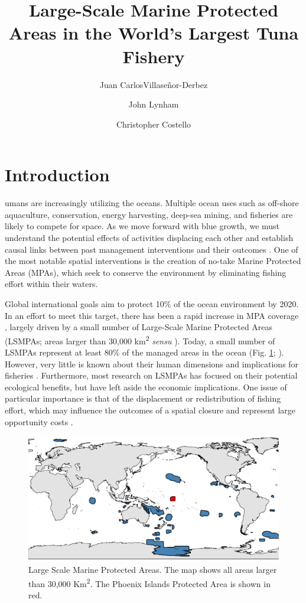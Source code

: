 \documentclass[9p,twocolumn,twoside,lineno]{pnas-new}
\title{Large-Scale Marine Protected Areas in the World's Largest Tuna Fishery}
\author[a,1]{Juan CarlosVillase\~{n}or-Derbez}
\author[b]{John Lynham}
\author[a]{Christopher Costello}
\affil[a]{Bren School of Environmental Science \& Management, University of California at Santa Barbara, Santa Barbara, CA}
\affil[b]{Department of Economics, University of Hawaii at Manoa, Honolulu, HI}
\begin{document}
\maketitle
\thispagestyle{firststyle}


\section{Introduction}\label{introduction}

umans are increasingly utilizing the oceans. Multiple ocean uses such as off-shore aquaculture, conservation, energy harvesting, deep-sea mining, and fisheries are likely to compete for space. As we move forward with blue growth, we must understand the potential effects of activities displacing each other and establish causal links between past management interventions and their outcomes \citep{burgess_2018}. One of the most notable spatial interventions is the creation of no-take Marine Protected Areas (MPAs), which seek to conserve the environment by eliminating fishing effort within their waters.

Global international goals aim to protect 10\% of the ocean environment by 2020. In an effort to meet this target, there has been a rapid increase in MPA coverage \citep{wood_2008,sala_2018}, largely driven by a small number of Large-Scale Marine Protected Areas (LSMPAs; areas larger than 30,000 km\textsuperscript{2} \emph{sensu} \cite{desanto_2013}). Today, a small number of LSMPAs represent at least 80\% of the managed areas in the ocean (Fig. \ref{fig:LSMPAs_map}; \citep{toonen_2013}). However, very little is known about their human dimensions and implications for fisheries \citep{gray_2017}. Furthermore, most research on LSMPAs has focused on their potential ecological benefits, but have left aside the economic implications. One issue of particular importance is that of the displacement or redistribution of fishing effort, which may influence the outcomes of a spatial closure and represent large opportunity costs \citep{smith_2003,smith_2010}.

\begin{figure}[H]
\centering
\includegraphics{img/LSMPAs_map.pdf}
\caption{\label{fig:LSMPAs_map}Large Scale Marine Protected Areas. The map shows all areas larger than 30,000 Km\textsuperscript{2}. The Phoenix Islands Protected Area is shown in red.}
\end{figure}
\end{document}
